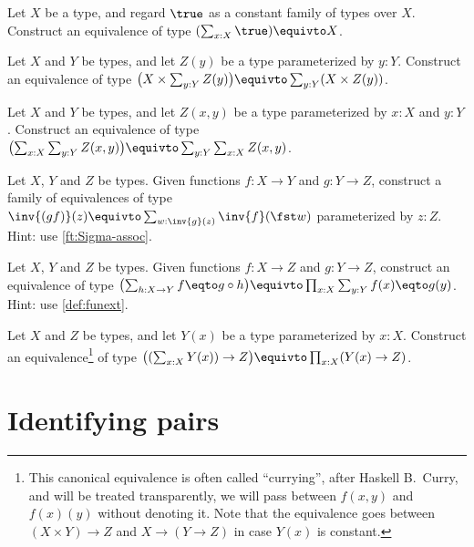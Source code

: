 \begin{xca}\label{xca:XequivXtimes1}
  Let $X$ be a type, and regard $\true$ as a constant family of types over $X$.
  Construct an equivalence of type $( \sum_{x:X} \true ) \equivto X $.
\end{xca}

\begin{xca}\label{xca:Sigma-distrib}
  Let $X$ and $Y$ be types, and let $Z(y)$ be a type parameterized by $y:Y$.
  Construct an equivalence of type
  $\bigl(X\times\sum_{y:Y}Z(y)\bigr) \equivto \sum_{y:Y}(X\times Z(y))$.
\end{xca}

\begin{xca}\label{xca:Sigma-comm}
  Let $X$ and $Y$ be types, and let $Z(x,y)$ be a type parameterized by
  $x:X$ and $y:Y$.
  Construct an equivalence of type $\bigl(\sum_{x:X}\sum_{y:Y}Z(x,y)\bigr)
  \equivto \sum_{y:Y}\sum_{x:X}Z(x,y)$.
\end{xca}

\begin{xca}\label{xca:fib-of-comp}
  Let $X$, $Y$ and $Z$ be types. Given functions $f: X\to Y$ and $g: Y\to Z$,
  construct a family of equivalences of type
  $\inv{(gf)}(z) \equivto \sum_{w:\inv{g}(z)}\inv{f}(\fst w)$ parameterized
  by $z:Z$. Hint: use \cref{ft:Sigma-assoc}.
\end{xca}

\begin{xca}\label{xca:prod-of-fibs}
  Let $X$, $Y$ and $Z$ be types. Given functions $f: X\to Z$ and $g: Y\to Z$,
  construct an equivalence of type 
  $\bigl(\sum_{h:X\to Y} f \eqto g\circ h\bigr) \equivto 
    \prod_{x:X}\sum_{y:Y} f(x) \eqto g(y)$.
  Hint: use \cref{def:funext}.
\end{xca}

\begin{xca}\label{xca:Sigma-curry}
  Let $X$ and $Z$ be types, and let $Y(x)$ be a type parameterized by $x:X$.
  Construct an equivalence\footnote{%
  This canonical equivalence is often called ``currying'', 
  after Haskell B.~Curry, and will be treated transparently, \ie
  we will pass between $f(x,y)$ and $f(x)(y)$ without denoting it. 
  Note that the equivalence goes between
  $(X\times Y)\to Z$ and $X\to(Y\to Z)$ in case $Y(x)$ is constant. 
  }
  of type $\bigl((\sum_{x:X}Y(x))\to Z\bigr)\equivto \prod_{x:X}(Y(x)\to Z)$.
\end{xca}

\section{Identifying pairs}\label{sec:pairpaths}

